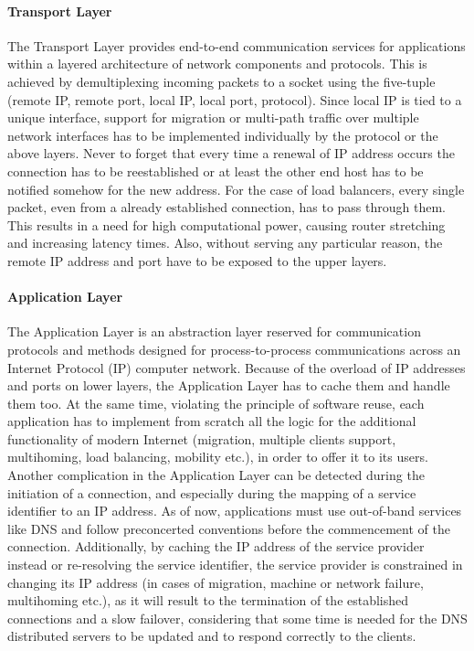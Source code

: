 \documentclass[12pt,a4paper,oneside]{article}
\begin{document}
\paragraph{Transport Layer} The Transport Layer provides end-to-end communication services for applications within a layered architecture of network components and protocols. This is achieved by demultiplexing incoming packets to a socket using the five-tuple (remote IP, remote port, local IP, local port, protocol). Since local IP is tied to a unique interface, support for migration or multi-path traffic over multiple network interfaces has to be implemented individually by the protocol or the above layers. Never to forget that every time a renewal of IP address occurs the connection has to be reestablished or at least the other end host has to be notified somehow for the new address. For the case of load balancers, every single packet, even from a already established connection, has to pass through them. This results in a need for high computational power, causing router stretching and increasing latency times. Also, without serving any particular reason, the remote IP address and port have to be exposed to the upper layers.
\paragraph{Application Layer}  The Application Layer is an abstraction layer reserved for communication protocols and methods designed for process-to-process communications across an Internet Protocol (IP) computer network. Because of the overload of IP addresses and ports on lower layers, the Application Layer has to cache them and handle them too. At the same time, violating the principle of software reuse, each application has to implement from scratch all the logic for the additional functionality of modern Internet (migration, multiple clients support, multihoming, load balancing, mobility etc.), in order to offer it to its users.\\
\indent Another complication in the Application Layer can be detected during the initiation of a connection, and especially during the mapping of a service identifier to an IP address. As of now, applications must use out-of-band services like DNS and follow preconcerted conventions before the commencement of the connection. Additionally, by caching the IP address of the service provider instead or re-resolving the service identifier, the service provider is constrained in changing its IP address (in cases of migration, machine or network failure, multihoming etc.), as it will result to the termination of the established connections and a slow failover, considering that some time is needed for the DNS distributed servers to be updated and to respond correctly to the clients.
\end{document}
